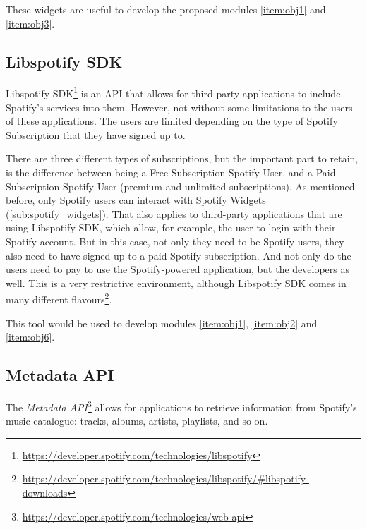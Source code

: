       These widgets are useful to develop the proposed modules \ref{item:obj1} and \ref{item:obj3}.


    \subsection{Libspotify SDK} %
    \label{sub:libspotify_sdk}

      Libspotify SDK\footnote{\url{https://developer.spotify.com/technologies/libspotify}} is an API that allows for third-party applications to include Spotify's services into them.
      However, not without some limitations to the users of these applications.
      The users are limited depending on the type of Spotify Subscription that they have signed up to.

      There are three different types of subscriptions, but the important part to retain, is the difference between being a Free Subscription Spotify User, and a Paid Subscription Spotify User (premium and unlimited subscriptions).
      As mentioned before, only Spotify users can interact with Spotify Widgets (\ref{sub:spotify_widgets}).
      That also applies to third-party applications that are using Libspotify SDK, which allow, for example, the user to login with their Spotify account.
      But in this case, not only they need to be Spotify users, they also need to have signed up to a paid Spotify subscription.
      And not only do the users need to pay to use the Spotify-powered application, but the developers as well.
      This is a very restrictive environment, although Libspotify SDK comes in many different flavours\footnote{\url{https://developer.spotify.com/technologies/libspotify/\#libspotify-downloads}}.

      This tool would be used to develop modules \ref{item:obj1}, \ref{item:obj2} and \ref{item:obj6}.
      



    \subsection{Metadata API} %
    \label{sub:metadata_api}

      The \emph{Metadata API}\footnote{\url{https://developer.spotify.com/technologies/web-api}} allows for applications to retrieve information from Spotify's music catalogue: tracks, albums, artists, playlists, and so on.

